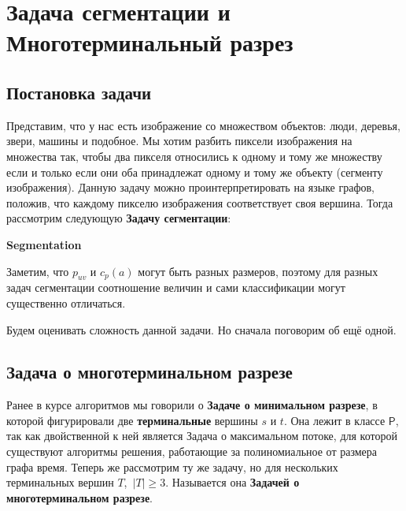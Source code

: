 \documentclass[a4paper,12pt]{article}
\newcommand{\Pclass}{\mathsf{P}}
\begin{document}
\newpage
\section{Задача сегментации и Многотерминальный разрез}

\subsection{Постановка задачи}
Представим, что у нас есть изображение со множеством объектов: люди, деревья, звери, машины и подобное. Мы хотим разбить пиксели изображения на множества так, чтобы два пикселя относились к одному и тому же множеству если и только если они оба принадлежат одному и тому же объекту (сегменту изображения). Данную задачу можно проинтерпретировать на языке графов, положив, что каждому пикселю изображения соответствует своя вершина. Тогда рассмотрим следующую \textbf{Задачу сегментации}:

\textbf{Segmentation}
\begin{algorithmic}
\end{algorithmic}
Заметим, что $p_{uv}$ и $c_p(a)$ могут быть разных размеров, поэтому для разных задач сегментации соотношение величин и сами классификации могут существенно отличаться.

Будем оценивать сложность данной задачи. Но сначала поговорим об ещё одной.

\subsection{Задача о многотерминальном разрезе}

Ранее в курсе алгоритмов мы говорили о \textbf{Задаче о минимальном разрезе}, в которой фигурировали две \textbf{терминальные} вершины $s$ и $t$. Она лежит в классе $\Pclass$, так  как двойственной к ней является $\textbf{Задача о максимальном потоке}$, для которой существуют алгоритмы решения, работающие за полиномиальное от размера графа время. Теперь же рассмотрим ту же задачу, но для нескольких терминальных вершин $T$,\ $|T| \geqslant 3$. Называется она \textbf{Задачей о многотерминальном разрезе}.
\end{document}
